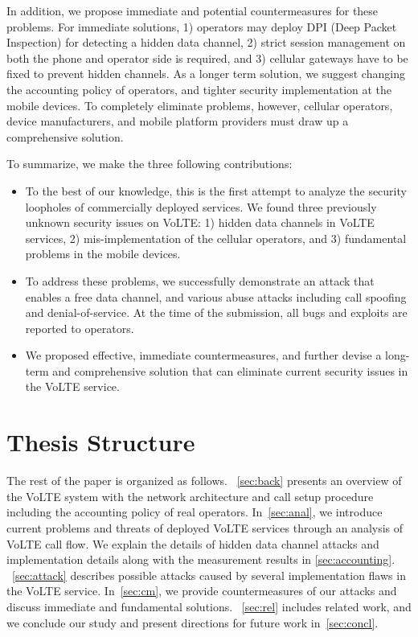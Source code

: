 In addition, we propose immediate and potential countermeasures for these
problems. For immediate solutions, 1) operators may deploy DPI (Deep Packet
Inspection) for detecting a hidden data channel, 2) strict session management on
both the phone and operator side is required, and 3) cellular gateways have to
be fixed to prevent hidden channels. As a longer term solution, we suggest
changing the accounting policy of operators, and tighter security implementation
at the mobile devices.  To completely eliminate problems, however, cellular
operators, device manufacturers, and mobile platform providers must draw up a
comprehensive solution.

To summarize, we make the three following contributions:
\begin{itemize}
\item To the best of our knowledge, this is the first attempt
  to analyze the security loopholes
  of commercially deployed \vt services.
  We found three previously unknown security issues on VoLTE:
  1) hidden data channels in VoLTE services,
  2) mis-implementation of the cellular operators, and
  3) fundamental problems in the mobile devices.
\item To address these problems, 
  we successfully demonstrate an attack that enables a free data
  channel, and various abuse attacks
  including call spoofing and denial-of-service.
  At the time of the submission, all bugs and exploits are reported to
  operators.
\item We proposed effective, immediate countermeasures,
  and further devise a long-term and comprehensive solution
  that can eliminate current security issues in the VoLTE service.
\end{itemize}

\section{Thesis Structure}
The rest of the paper is organized as follows. ~\autoref{sec:back} presents an
overview of the VoLTE system with the network architecture and call setup procedure
including the accounting policy of real operators.  In~\autoref{sec:anal}, we
introduce current problems and threats of deployed VoLTE services through an analysis
of VoLTE call flow.  We explain the details of hidden data channel attacks and
implementation details along with the measurement results in
\autoref{sec:accounting}. ~\autoref{sec:attack} describes possible attacks
caused by several implementation flaws in the VoLTE service.  In~\autoref{sec:cm},
we provide countermeasures of our attacks and discuss immediate and
fundamental solutions. ~\autoref{sec:rel} includes related work, and we
conclude our study and present directions for future work in~\autoref{sec:concl}.

